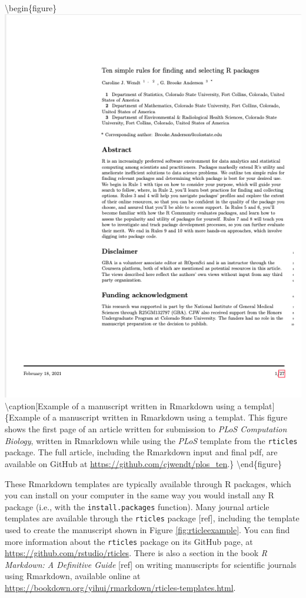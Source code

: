 \documentclass[]{tufte-book}
\begin{document}
\textbackslash begin\{figure\}
\includegraphics[width=\textwidth]{figures/rticles_example} \textbackslash caption{[}Example of a manuscript written in Rmarkdown using a templat{]}\{Example of a manuscript written in Rmarkdown using a templat. This figure shows the first page of an article written for submission to \emph{PLoS Computation Biology}, written in Rmarkdown while using the \emph{PLoS} template from the \texttt{rticles} package. The full article, including the Rmarkdown input and final pdf, are available on GitHub at \url{https://github.com/cjwendt/plos_ten}.\}\label{fig:rticleexample}
\textbackslash end\{figure\}

These Rmarkdown templates are typically available through R packages, which you
can install on your computer in the same way you would install any R package
(i.e., with the \texttt{install.packages} function). Many journal article templates are
available through the \texttt{rticles} package {[}ref{]}, including the template used to
create the manuscript shown in Figure \ref{fig:rticleexample}. You can find
more information about the \texttt{rticles} package on its GitHub page, at
\url{https://github.com/rstudio/rticles}. There is also a section in the book \emph{R
Markdown: A Definitive Guide} {[}ref{]} on writing manuscripts for scientific
journals using Rmarkdown, available online at
\url{https://bookdown.org/yihui/rmarkdown/rticles-templates.html}.
\end{document}
